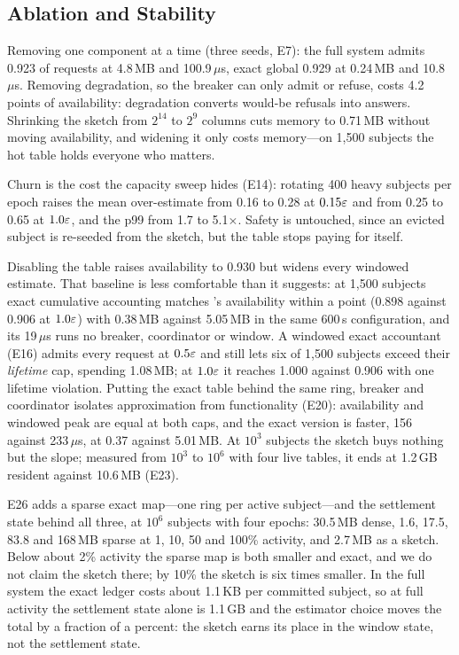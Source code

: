 \subsection{Ablation and Stability}
\label{sec:eval-ablation}

Removing one component at a time (three seeds, E7): the full system admits 0.923 of
requests at 4.8\,MB and 100.9\,$\mu$s, exact global 0.929 at 0.24\,MB and
10.8\,$\mu$s. Removing degradation, so the breaker can only admit or refuse, costs 4.2
points of availability: degradation converts would-be refusals into answers. Shrinking
the sketch from $2^{14}$ to $2^{9}$ columns cuts memory to 0.71\,MB without moving
availability, and widening it only costs memory---on 1{,}500 subjects the hot table
holds everyone who matters.

Churn is the cost the capacity sweep hides (E14): rotating 400 heavy subjects per epoch
raises the mean over-estimate from 0.16 to 0.28 at $0.15\varepsilon$ and from 0.25 to 0.65 at
$1.0\varepsilon$, and the p99 from 1.7 to 5.1$\times$. Safety is untouched, since an evicted
subject is re-seeded from the sketch, but the table stops paying for itself.

Disabling the table raises availability to 0.930 but widens every windowed estimate.
That baseline is less comfortable than it suggests: at 1{,}500 subjects exact cumulative
accounting matches \sys's availability within a point (0.898 against 0.906 at
$1.0\varepsilon$) with 0.38\,MB against 5.05\,MB in the same 600\,s configuration, and its
19\,$\mu$s runs no breaker, coordinator or window. A windowed exact accountant (E16)
admits every request at $0.5\varepsilon$ and still lets six of 1{,}500 subjects exceed their
\emph{lifetime} cap, spending 1.08\,MB; at $1.0\varepsilon$ it reaches 1.000 against 0.906 with
one lifetime violation. Putting the exact table behind the same ring, breaker and
coordinator isolates approximation from functionality (E20): availability and windowed
peak are equal at both caps, and the exact version is faster, 156 against
233\,$\mu$s, at 0.37 against 5.01\,MB. At $10^{3}$ subjects the sketch buys nothing but the slope; measured from $10^{3}$ to
$10^{6}$ with four live tables, it ends at 1.2\,GB resident against 10.6\,MB (E23).

E26 adds a sparse exact map---one ring per active
subject---and the settlement state behind all three, at $10^{6}$ subjects with four
epochs: 30.5\,MB dense, 1.6, 17.5, 83.8 and 168\,MB sparse at 1, 10, 50 and 100\%
activity, and 2.7\,MB as a sketch. Below about 2\% activity the sparse map is both
smaller and exact, and we do not claim the sketch there; by 10\% the sketch is six times
smaller. In the full system the exact ledger costs about 1.1\,KB per committed subject,
so at full activity the settlement state alone is 1.1\,GB and the estimator choice moves
the total by a fraction of a percent: the sketch earns its place in the window state,
not the settlement state.

